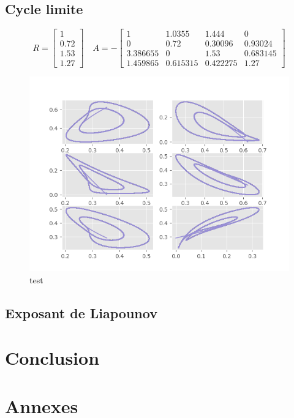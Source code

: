 \documentclass{wsdcr}
\begin{document}
\subsection{Cycle limite}
\begin{equation}
R={\begin{bmatrix}1\\0.72\\1.53\\1.27\end{bmatrix}}\quad A =-{\begin{bmatrix}1&1.0355&1.444&0\\0&0.72&0.30096&0.93024\\3.386655&0&1.53&0.683145\\1.459865&0.615315&0.422275&1.27\end{bmatrix}}
\end{equation}
\begin{figure}[t!]
    \centering
    \includegraphics[width=\linewidth]{fig/lv4_cl.png}
    \caption{test}
    \label{fig:example}
\end{figure}
\subsection{Exposant de Liapounov}
\section{Conclusion}

\section{Annexes}
\end{document}
